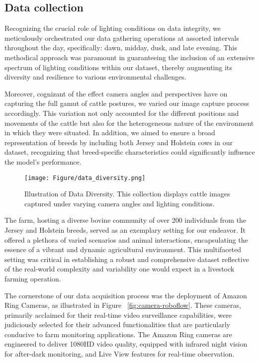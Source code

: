 \subsection{Data collection}



Recognizing the crucial role of lighting conditions on data integrity, we meticulously orchestrated our data gathering operations at assorted intervals throughout the day, specifically: dawn, midday, dusk, and late evening. This methodical approach was paramount in guaranteeing the inclusion of an extensive spectrum of lighting conditions within our dataset, thereby augmenting its diversity and resilience to various environmental challenges.

Moreover, cognizant of the effect camera angles and perspectives have on capturing the full gamut of cattle postures, we varied our image capture process accordingly. This variation not only accounted for the different positions and movements of the cattle but also for the heterogeneous nature of the environment in which they were situated. In addition, we aimed to ensure a broad representation of breeds by including both Jersey and Holstein cows in our dataset, recognizing that breed-specific characteristics could significantly influence the model's performance.


\begin{figure}[h]
    \centering
    \texttt{[image: Figure/data\_diversity.png]}
    \caption{Illustration of Data Diversity. This collection displays cattle images captured under varying camera angles and lighting conditions.}
    \label{fig:data-diversity}
\end{figure}


The farm, hosting a diverse bovine community of over 200 individuals from the Jersey and Holstein breeds, served as an exemplary setting for our endeavor. It offered a plethora of varied scenarios and animal interactions, encapsulating the essence of a vibrant and dynamic agricultural environment. This multifaceted setting was critical in establishing a robust and comprehensive dataset reflective of the real-world complexity and variability one would expect in a livestock farming operation.

The cornerstone of our data acquisition process was the deployment of Amazon Ring Cameras, as illustrated in Figure ~\ref{fig:camera-roboflow}. These cameras, primarily acclaimed for their real-time video surveillance capabilities, were judiciously selected for their advanced functionalities that are particularly conducive to farm monitoring applications. The Amazon Ring cameras are engineered to deliver 1080HD video quality, equipped with infrared night vision for after-dark monitoring, and Live View features for real-time observation.

